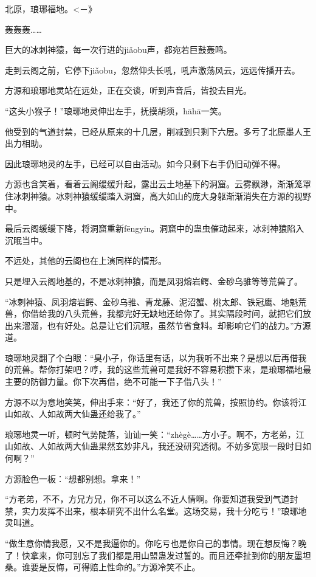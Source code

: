 
\begin{this_body}

北原，琅琊福地。<－》

轰轰轰……

巨大的冰刺神猿，每一次行进的jiǎobu声，都宛若巨鼓轰鸣。

走到云阁之前，它停下jiǎobu，忽然仰头长吼，吼声激荡风云，远远传播开去。

方源和琅琊地灵站在远处，正在交谈，听到声音后，皆投去目光。

“这头小猴子！”琅琊地灵伸出左手，抚摸胡须，hāhā一笑。

他受到的气道封禁，已经从原来的十几层，削减到只剩下六层。多亏了北原墨人王出力相助。

因此琅琊地灵的左手，已经可以自由活动。如今只剩下右手仍旧动弹不得。

方源也含笑着，看着云阁缓缓升起，露出云土地基下的洞窟。云雾飘渺，渐渐笼罩住冰刺神猿。冰刺神猿缓缓踏入洞窟，高大如山的庞大身躯渐渐消失在方源的视野中。

最后云阁缓缓下降，将洞窟重新fēngyin。洞窟中的蛊虫催动起来，冰刺神猿陷入沉眠当中。

不远处，其他的云阁也在上演同样的情形。

只是埋入云阁地基的，不是冰刺神猿，而是凤羽熔岩鳄、金砂乌骓等等荒兽了。

“冰刺神猿、凤羽熔岩鳄、金砂乌骓、青龙藤、泥沼蟹、桃太郎、铁冠鹰、地魁荒兽，你借给我的八头荒兽，我都完好无缺地还给你了。其实隔段时间，就把它们放出来溜溜，也有好处。总是让它们沉眠，虽然节省食料。却影响它们的战力。”方源道。

琅琊地灵翻了个白眼：“臭小子，你话里有话，以为我听不出来？是想以后再借我的荒兽。帮你打架吧？哼，我的这些荒兽可是我好不容易积攒下来，是琅琊福地最主要的防御力量。你下次再借，绝不可能一下子借八头！”

方源不以为意地笑笑，伸出手来：“好了，我还了你的荒兽，按照协约。你该将江山如故、人如故两大仙蛊还给我了。”

琅琊地灵一听，顿时气势陡落，讪讪一笑：“zhègè……方小子。啊不，方老弟，江山如故、人如故两大仙蛊果然玄妙非凡，我还没研究透彻。不妨多宽限一段时日如何啊？”

方源脸色一板：“想都别想。拿来！”

“方老弟，不不，方兄方兄，你不可以这么不近人情啊。你要知道我受到气道封禁，实力发挥不出来，根本研究不出什么名堂。这场交易，我十分吃亏！”琅琊地灵叫道。

“做生意你情我愿，又不是我逼你的。你吃亏也是你自己的事情。现在想反悔？晚了！快拿来，你可别忘了我们都是用山盟蛊发过誓的。而且还牵扯到你的朋友墨坦桑。谁要是反悔，可得赔上性命的。”方源冷笑不止。


\end{this_body}
